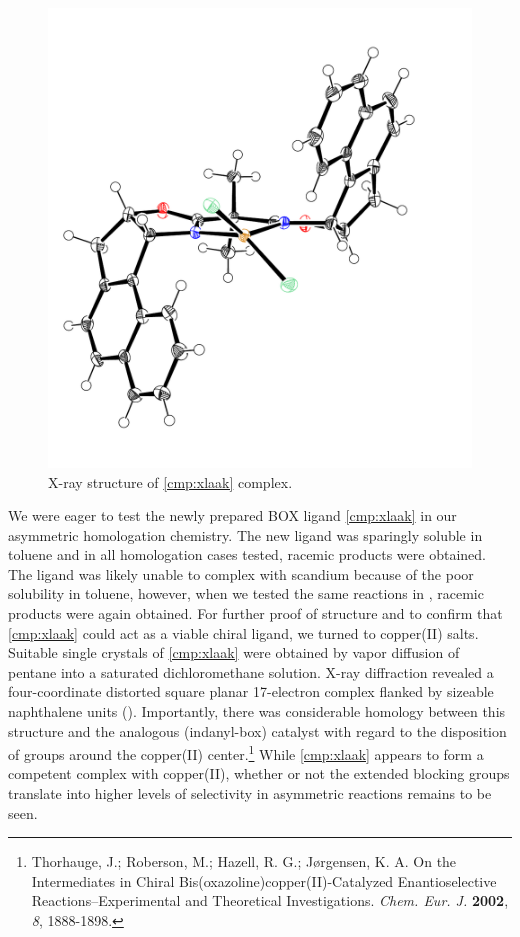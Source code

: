  \begin{figure}[ht]
  \centering
  \vspace{-15pt}
  \includegraphics[scale=0.55]{chp_asymmetric/images/xray/boxcomplex_nolabels}
  \vspace{-10pt}
  \caption{X-ray structure of \ref{cmp:xlaak} complex.}
  \label{fig:astlcopperbox}
\end{figure}
We were eager to test the newly prepared BOX ligand \ref{cmp:xlaak} in our asymmetric homologation
chemistry. The new ligand was sparingly soluble in toluene and in all homologation cases tested,
racemic products were obtained. The ligand was likely unable to complex with scandium because of the
poor solubility in toluene, however, when we tested the same reactions in , racemic
products were again obtained. For further proof of structure and to confirm that \ref{cmp:xlaak}
could act as a viable chiral ligand, we turned to copper(II) salts. Suitable single crystals of
\ref{cmp:xlaak} were obtained by vapor diffusion of pentane into a saturated
dichloromethane solution. X-ray diffraction revealed a four-coordinate
distorted square planar 17-electron complex flanked by sizeable naphthalene units
().
Importantly, there was considerable homology between this structure and the analogous
(indanyl-box) catalyst with regard to the disposition of groups around the
copper(II) center.\footnote{{\frenchspacing Thorhauge, J.; Roberson, M.; Hazell, R. G.; J\o rgensen,
K. A. On the Intermediates in Chiral Bis(oxazoline)copper(II)-Catalyzed Enantioselective
Reactions--Experimental and Theoretical Investigations. \textit{Chem. Eur. J.} \textbf{2002},
\textit{8}, 1888-1898.}} While \ref{cmp:xlaak} appears to form a competent complex with
copper(II), whether or not the extended blocking groups translate into higher levels of selectivity
in asymmetric reactions remains to be seen.



